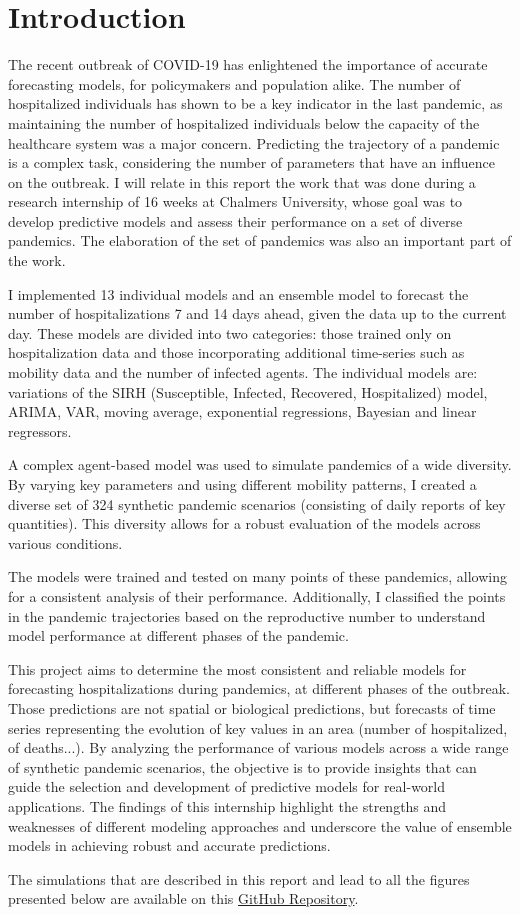 \section{Introduction}

The recent outbreak of COVID-19 has enlightened the importance of accurate forecasting models, for policymakers and population alike. 
The number of hospitalized individuals has shown to be a key indicator in the last pandemic, as maintaining the number of hospitalized individuals below the capacity of the healthcare system was a major concern.
Predicting the trajectory of a pandemic is a complex task, considering the number of parameters that have an influence on the outbreak. 
I will relate in this report the work that was done during a research internship of 16 weeks at Chalmers University, whose goal was to develop predictive models and assess their performance on a set of diverse pandemics. 
The elaboration of the set of pandemics was also an important part of the work. 

I implemented 13 individual models and an ensemble model to forecast the number of hospitalizations 7 and 14 days ahead, given the data up to the current day.
These models are divided into two categories: those trained only on hospitalization data and those incorporating additional time-series such as mobility data and the number of infected agents. 
The individual models are: variations of the SIRH (Susceptible, Infected, Recovered, Hospitalized) model, ARIMA, VAR, moving average, exponential regressions, Bayesian and linear regressors.

A complex agent-based model was used to simulate pandemics of a wide diversity. 
By varying key parameters and using different mobility patterns, I created a diverse set of 324 synthetic pandemic scenarios (consisting of daily reports of key quantities). 
This diversity allows for a robust evaluation of the models across various conditions.

The models were trained and tested on many points of these pandemics, allowing for a consistent analysis of their performance. 
Additionally, I classified the points in the pandemic trajectories based on the reproductive number to understand model performance at different phases of the pandemic.

This project aims to determine the most consistent and reliable models for forecasting hospitalizations during pandemics, at different phases of the outbreak. 
Those predictions are not spatial or biological predictions, but forecasts of time series representing the evolution of key values in an area (number of hospitalized, of deaths...). 
By analyzing the performance of various models across a wide range of synthetic pandemic scenarios, the objective is to provide insights that can guide the selection and development of predictive models for real-world applications. 
The findings of this internship highlight the strengths and weaknesses of different modeling approaches and underscore the value of ensemble models in achieving robust and accurate predictions.

The simulations that are described in this report and lead to all the figures presented below are available on this  \href{https://github.com/gregoirebechade/covid_internship}{GitHub Repository}\label{github-link}.

